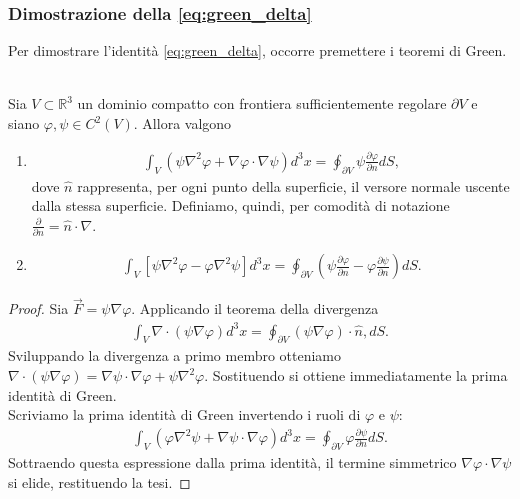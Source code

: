 \subsubsection{Dimostrazione della \eqref{eq:green_delta}}
Per dimostrare l'identità \eqref{eq:green_delta}, occorre premettere i teoremi di Green.
\begin{lemma} \hspace{1cm} \\
    Sia $V \subset \mathbb{R}^3$ un dominio compatto con frontiera sufficientemente regolare $\partial V$ e siano $\varphi, \psi \in C^2(V)$. Allora valgono
    \begin{enumerate}[label=\protect\circled{\arabic*}]
        \item \begin{align}
            \int_V (\psi \nabla^2 \varphi + \nabla \varphi \cdot \nabla \psi) d^3x = \oint_{\partial V} \psi \frac{\partial \varphi}{\partial n} dS,
        \end{align}
	dove $\hat{n}$ rappresenta, per ogni punto della superficie, il versore normale uscente dalla stessa superficie. Definiamo, quindi, per comodità di notazione $\frac{\partial}{\partial n} = \hat{n} \cdot \nabla$.
        \item \begin{align}
            \int_V \left[ \psi \nabla^2 \varphi - \varphi \nabla^2 \psi \right] d^3x = \oint_{\partial V} \left(\psi \frac{\partial \varphi}{\partial n} - \varphi \frac{\partial \psi}{\partial n}\right) dS.
        \end{align}
    \end{enumerate}
\end{lemma}
\begin{proof}
     Sia $\vec{F} = \psi \nabla \varphi$. Applicando il teorema della divergenza
    \begin{align}\int_V \nabla \cdot (\psi \nabla \varphi) d^3 x = \oint_{\partial V} (\psi \nabla \varphi) \cdot \hat{n} , dS.
    \end{align}
    Sviluppando la divergenza a primo membro otteniamo $\nabla \cdot (\psi \nabla \varphi) = \nabla \psi \cdot \nabla \varphi + \psi \nabla^2 \varphi$. Sostituendo si ottiene immediatamente la prima identità di Green. \\
     Scriviamo la prima identità di Green invertendo i ruoli di $\varphi$ e $\psi$:
    \begin{align}
        \int_V (\varphi \nabla^2 \psi + \nabla \psi \cdot \nabla \varphi) d^3 x = \oint_{\partial V} \varphi \frac{\partial \psi}{\partial n} dS.
    \end{align}
    Sottraendo questa espressione dalla prima identità, il termine simmetrico $\nabla \varphi \cdot \nabla \psi$ si elide, restituendo la tesi.
\end{proof}
